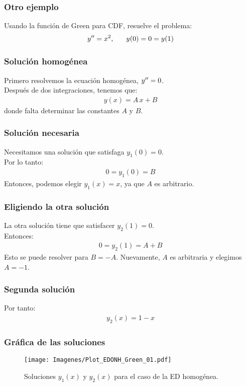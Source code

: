 \documentclass[12pt]{beamer}
\begin{document}
\begin{frame}
\frametitle{Otro ejemplo}
Usando la función de Green para CDF, resuelve el problema:
\pause
\begin{align*}
{y}^{\prime \prime} = x^{2}, \hspace{0.6cm} y (0) = 0 = y (1)
\end{align*}
\end{frame}

\begin{frame}
\frametitle{Solución homogénea}
Primero resolvemos la ecuación homogénea, ${y}^{\prime \prime} = 0$.
\\
\bigskip
\pause
Después de dos integraciones, tenemos que:
\pause
\begin{align*}
y (x) = A \, x + B
\end{align*}
donde falta determinar las constantes $A$ y $B$.
\end{frame}

\begin{frame}
\frametitle{Solución necesaria}
Necesitamos una solución que satisfaga $y_{1} (0) = 0$.
\\
\bigskip
\pause
Por lo tanto:
\pause
\begin{align*}
0 = y_{1} (0) = B
\end{align*}
\pause
Entonces, podemos elegir $y_{1} (x) = x$, ya que $A$ es arbitrario.
\end{frame}

\begin{frame}
\frametitle{Eligiendo la otra solución}
La otra solución tiene que satisfacer $y_{2} (1) = 0$. 
\\
\bigskip
\pause
Entonces:
\pause
\begin{align*}
0 = y_{2} (1) = A + B
\end{align*}
\pause
Esto se puede resolver para $B = - A$. \pause Nuevamente, $A$ es arbitraria y elegimos $A = - 1$.
\end{frame}

\begin{frame}
\frametitle{Segunda solución}
Por tanto:
\pause
\begin{align*}
y_{2} (x) = 1 - x
\end{align*}
\end{frame}

\begin{frame}
\frametitle{Gráfica de las soluciones}
\begin{figure}[H]
    \centering
    \texttt{[image: Imagenes/Plot\_EDONH\_Green\_01.pdf]}
    \caption{Soluciones $y_{1} (x)$ y $y_{2} (x)$ para el caso de la ED homogénea.}
    \label{fig:figura_05}
\end{figure}
\end{frame}
\end{document}
